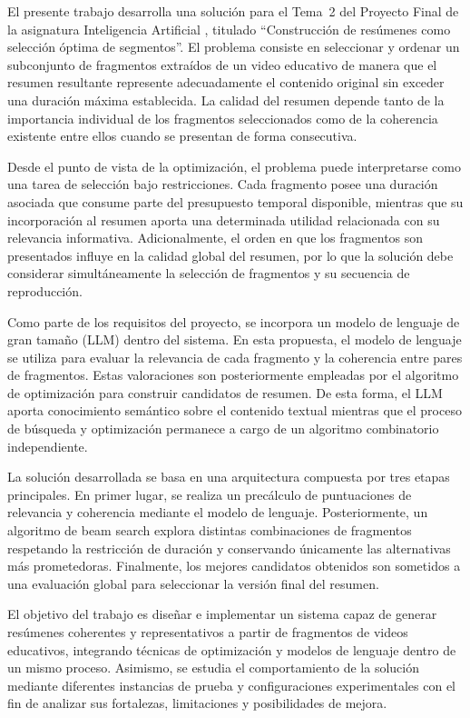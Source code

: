 \documentclass[12pt,a4paper]{article}
\begin{document}
El presente trabajo desarrolla una solución para el Tema~2 del Proyecto Final de la asignatura Inteligencia Artificial \cite{orientacion2025}, titulado “Construcción de resúmenes como selección óptima de segmentos”. El problema consiste en seleccionar y ordenar un subconjunto de fragmentos extraídos de un video educativo de manera que el resumen resultante represente adecuadamente el contenido original sin exceder una duración máxima establecida. La calidad del resumen depende tanto de la importancia individual de los fragmentos seleccionados como de la coherencia existente entre ellos cuando se presentan de forma consecutiva.

Desde el punto de vista de la optimización, el problema puede interpretarse como una tarea de selección bajo restricciones. Cada fragmento posee una duración asociada que consume parte del presupuesto temporal disponible, mientras que su incorporación al resumen aporta una determinada utilidad relacionada con su relevancia informativa. Adicionalmente, el orden en que los fragmentos son presentados influye en la calidad global del resumen, por lo que la solución debe considerar simultáneamente la selección de fragmentos y su secuencia de reproducción.

Como parte de los requisitos del proyecto, se incorpora un modelo de lenguaje de gran tamaño (LLM) dentro del sistema. En esta propuesta, el modelo de lenguaje se utiliza para evaluar la relevancia de cada fragmento y la coherencia entre pares de fragmentos. Estas valoraciones son posteriormente empleadas por el algoritmo de optimización para construir candidatos de resumen. De esta forma, el LLM aporta conocimiento semántico sobre el contenido textual mientras que el proceso de búsqueda y optimización permanece a cargo de un algoritmo combinatorio independiente.

La solución desarrollada se basa en una arquitectura compuesta por tres etapas principales. En primer lugar, se realiza un precálculo de puntuaciones de relevancia y coherencia mediante el modelo de lenguaje. Posteriormente, un algoritmo de beam search explora distintas combinaciones de fragmentos respetando la restricción de duración y conservando únicamente las alternativas más prometedoras. Finalmente, los mejores candidatos obtenidos son sometidos a una evaluación global para seleccionar la versión final del resumen.

El objetivo del trabajo es diseñar e implementar un sistema capaz de generar resúmenes coherentes y representativos a partir de fragmentos de videos educativos, integrando técnicas de optimización y modelos de lenguaje dentro de un mismo proceso. Asimismo, se estudia el comportamiento de la solución mediante diferentes instancias de prueba y configuraciones experimentales con el fin de analizar sus fortalezas, limitaciones y posibilidades de mejora.
\end{document}
